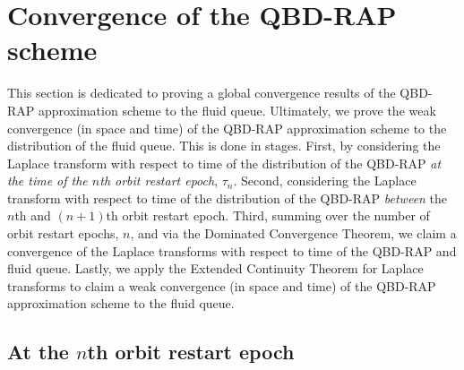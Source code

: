 \section{Convergence of the QBD-RAP scheme}\label{sec: local to global}
This section is dedicated to proving a global convergence results of the QBD-RAP approximation scheme to the fluid queue. Ultimately, we prove the weak convergence (in space and time) of the QBD-RAP approximation scheme to the distribution of the fluid queue. This is done in stages. First, by considering the Laplace transform with respect to time of the distribution of the QBD-RAP \emph{at the time of the \(n\)th orbit restart epoch}, \(\tau_n\). Second, considering the Laplace transform with respect to time of the distribution of the QBD-RAP \emph{between} the \(n\)th and \((n+1)\)th orbit restart epoch. Third, summing over the number of orbit restart epochs, \(n\), and via the Dominated Convergence Theorem, we claim a convergence of the Laplace transforms with respect to time of the QBD-RAP and fluid queue. Lastly, we apply the Extended Continuity Theorem for Laplace transforms \cite[Chapter XIII, Theorem 2a]{feller1957} to claim a weak convergence (in space and time) of the QBD-RAP approximation scheme to the fluid queue.

\subsection{At the \(n\)th orbit restart epoch}\label{sec: nth change}


